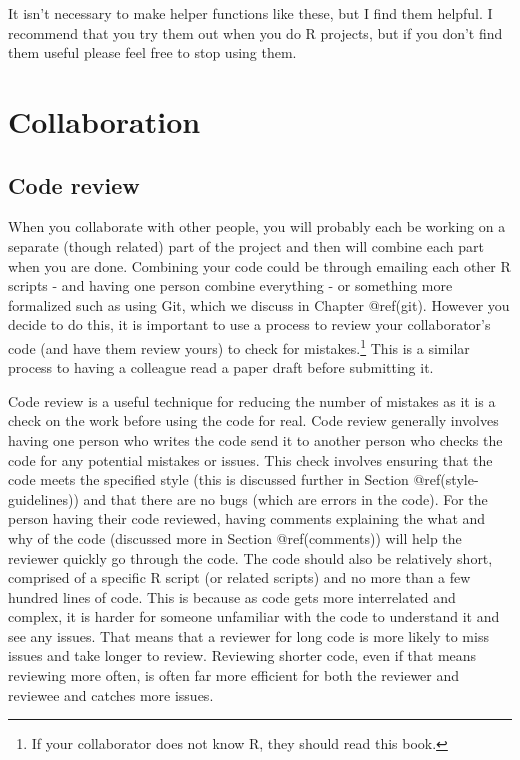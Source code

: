 \documentclass[
  a4paper,
]{krantz}
\begin{document}
It isn't necessary to make helper functions like these, but
I find them helpful. I recommend that you try them out when
you do R projects, but if you don't find them useful please
feel free to stop using them.

\hypertarget{collaboration}{%
\chapter{Collaboration}\label{collaboration}}

\hypertarget{code-review}{%
\section{Code review}\label{code-review}}

When you collaborate with other people, you will probably
each be working on a separate (though related) part of the
project and then will combine each part when you are done.
Combining your code could be through emailing each other R
scripts - and having one person combine everything - or
something more formalized such as using Git, which we
discuss in Chapter @ref(git). However you decide to do this,
it is important to use a process to review your
collaborator's code (and have them review yours) to check
for mistakes.\footnote{If your collaborator does not know R,
  they should read this book.} This is a similar process to
having a colleague read a paper draft before submitting it.

Code review is a useful technique for reducing the number of
mistakes as it is a check on the work before using the code
for real. Code review generally involves having one person
who writes the code send it to another person who checks the
code for any potential mistakes or issues. This check
involves ensuring that the code meets the specified style
(this is discussed further in Section
@ref(style-guidelines)) and that there are no bugs (which
are errors in the code). For the person having their code
reviewed, having comments explaining the what and why of the
code (discussed more in Section @ref(comments)) will help
the reviewer quickly go through the code. The code should
also be relatively short, comprised of a specific R script
(or related scripts) and no more than a few hundred lines of
code. This is because as code gets more interrelated and
complex, it is harder for someone unfamiliar with the code
to understand it and see any issues. That means that a
reviewer for long code is more likely to miss issues and
take longer to review. Reviewing shorter code, even if that
means reviewing more often, is often far more efficient for
both the reviewer and reviewee and catches more issues.
\end{document}
